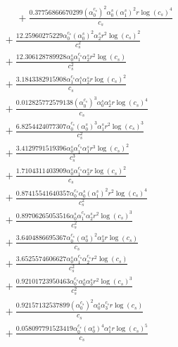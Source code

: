 \documentclass[10pt]{article}
\begin{document}
\begin{align*}
\phantom{R_{0,8}} &\phantom{={}}{}  + \frac{0.37756866670299 \left(\alpha_{0}^{c_s}\right)^{2} \alpha_{0}^s \left(\alpha_{1}^s\right)^{2} r \log{\left(c_{s} \right)}^{4}}{c_{s}} \\
&{}  + \frac{12.25960275229 \alpha_{0}^{c_s} \left(\alpha_{0}^s\right)^{2} \alpha_{2}^s r^{2} \log{\left(c_{s} \right)}^{2}}{c_{s}^{2}} \\
&{}  + \frac{12.306128789928 \alpha_{0}^s \alpha_{1}^{c_s} \alpha_{2}^s r^{2} \log{\left(c_{s} \right)}}{c_{s}^{2}} \\
&{}  + \frac{3.1843382915908 \alpha_{1}^{c_s} \alpha_{1}^s \alpha_{2}^s r \log{\left(c_{s} \right)}^{2}}{c_{s}} \\
&{}  + \frac{0.012825772579138 \left(\alpha_{0}^{c_s}\right)^{3} \alpha_{0}^s \alpha_{2}^s r \log{\left(c_{s} \right)}^{4}}{c_{s}} \\
&{}  + \frac{6.8254424077307 \alpha_{0}^{c_s} \left(\alpha_{0}^s\right)^{3} \alpha_{1}^s r^{2} \log{\left(c_{s} \right)}^{3}}{c_{s}^{2}} \\
&{}  + \frac{3.4129791519396 \alpha_{0}^s \alpha_{1}^{c_s} \alpha_{1}^s r^{3} \log{\left(c_{s} \right)}^{2}}{c_{s}^{3}} \\
&{}  + \frac{1.7104311403909 \alpha_{0}^s \alpha_{1}^{c_s} \alpha_{3}^s r \log{\left(c_{s} \right)}^{2}}{c_{s}} \\
&{}  + \frac{0.87415541640357 \alpha_{0}^{c_s} \alpha_{0}^s \left(\alpha_{1}^s\right)^{2} r^{2} \log{\left(c_{s} \right)}^{4}}{c_{s}^{2}} \\
&{}  + \frac{0.89706265053516 \alpha_{0}^s \alpha_{1}^{c_s} \alpha_{2}^s r^{2} \log{\left(c_{s} \right)}^{3}}{c_{s}^{2}} \\
&{}  + \frac{3.6404886695367 \alpha_{0}^{c_s} \left(\alpha_{0}^s\right)^{2} \alpha_{3}^s r \log{\left(c_{s} \right)}}{c_{s}} \\
&{}  + \frac{3.6525574606627 \alpha_{0}^s \alpha_{1}^{c_s} \alpha_{2}^{c_s} r^{2} \log{\left(c_{s} \right)}}{c_{s}^{2}} \\
&{}  + \frac{0.92101723950463 \alpha_{0}^{c_s} \alpha_{0}^s \alpha_{3}^s r^{2} \log{\left(c_{s} \right)}^{3}}{c_{s}^{2}} \\
&{}  + \frac{0.92157132537899 \left(\alpha_{0}^{c_s}\right)^{2} \alpha_{0}^s \alpha_{3}^{c_s} r \log{\left(c_{s} \right)}}{c_{s}} \\
&{}  + \frac{0.058097791523419 \alpha_{0}^{c_s} \left(\alpha_{0}^s\right)^{4} \alpha_{1}^s r \log{\left(c_{s} \right)}^{5}}{c_{s}} \\

\end{align*}
\end{document}
